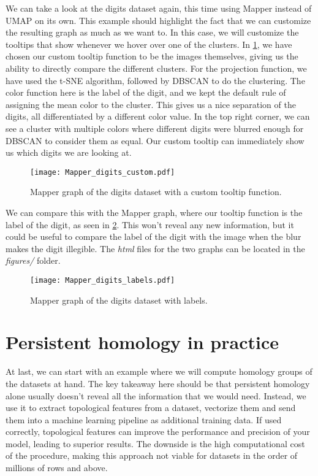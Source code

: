 We can take a look at the digits dataset again, this time using Mapper instead of UMAP on its own. This example should highlight the fact that we can customize the resulting graph as much as we want to. In this case, we will customize the tooltips that show whenever we hover over one of the clusters. In \ref{fig:mapper_digits_custom}, we have chosen our custom tooltip function to be the images themselves, giving us the ability to directly compare the different clusters. For the projection function, we have used the t-SNE algorithm, followed by DBSCAN to do the clustering. The color function here is the label of the digit, and we kept the default rule of assigning the mean color to the cluster. This gives us a nice separation of the digits, all differentiated by a different color value. In the top right corner, we can see a cluster with multiple colors where different digits were blurred enough for DBSCAN to consider them as equal. Our custom tooltip can immediately show us which digits we are looking at.

\begin{figure}[h!]
  \centering
  \texttt{[image: Mapper\_digits\_custom.pdf]}
  \caption{Mapper graph of the digits dataset with a custom tooltip function.}
  \label{fig:mapper_digits_custom}
\end{figure}

We can compare this with the Mapper graph, where our tooltip function is the label of the digit, as seen in \ref{fig:mapper_digits_labels}. This won't reveal any new information, but it could be useful to compare the label of the digit with the image when the blur makes the digit illegible. The \textit{html} files for the two graphs can be located in the \textit{figures/} folder.

\begin{figure}[h!]
  \centering
  \texttt{[image: Mapper\_digits\_labels.pdf]}
  \caption{Mapper graph of the digits dataset with labels.}
  \label{fig:mapper_digits_labels}
\end{figure}

\section{Persistent homology in practice}
At last, we can start with an example where we will compute homology groups of the datasets at hand. The key takeaway here should be that persistent homology alone usually doesn't reveal all the information that we would need. Instead, we use it to extract topological features from a dataset, vectorize them and send them into a machine learning pipeline as additional training data. If used correctly, topological features can improve the performance and precision of your model, leading to superior results. The downside is the high computational cost of the procedure, making this approach not viable for datasets in the order of millions of rows and above.

